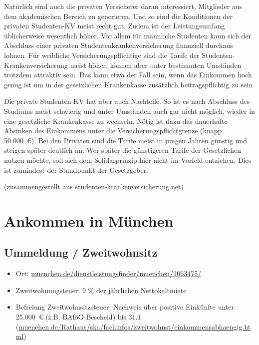 \documentclass[twoside,12pt,parskip=half-]{scrartcl}
\begin{document}
Natürlich sind auch die privaten Versicherer daran interessiert,
Mitglieder aus dem akademischen Bereich zu generieren. Und so sind die
Konditionen der privaten Studenten-KV meist recht gut. Zudem ist der
Leistungsumfang üblicherweise wesentlich höher. Vor allem für
männliche Studenten kann sich der Abschluss einer privaten
Studentenkrankenversicherung finanziell durchaus lohnen. Für weibliche
Versicherungspflichtige sind die Tarife der
Studenten-Krankenversicherung meist höher, können aber unter
bestimmten Umständen trotzdem attraktiv sein. Das kann etwa der Fall
sein, wenn das Einkommen hoch genug ist um in der gesetzlichen
Krankenkasse zusätzlich beitragspflichtig zu sein.

Die private Studenten-KV hat aber auch Nachteile. So ist es nach
Abschluss des Studiums meist schwierig und unter Umständen auch gar
nicht möglich, wieder in eine gesetzliche Krankenkasse zu
wechseln. Nötig ist dazu das dauerhafte Absinken des Einkommens unter
die Versicherungspflichtgrenze (knapp 50.000~€). Bei den Privaten sind
die Tarife meist in jungen Jahren günstig und steigen später deutlich
an. Wer später die günstigeren Tarife der Gesetzlichen nutzen möchte,
soll sich dem Solidarprinzip hier nicht im Vorfeld entziehen. Dies ist
zumindest der Standpunkt der Gesetzgeber.

\footnotesize (zusammengestellt aus {\url{studenten-krankenversicherung.net}})
\normalsize

\clearpage

\section{Ankommen in München}

\subsection{Ummeldung / Zweitwohnsitz}
\begin{itemize}
	\item Ort: \url{muenchen.de/dienstleistungsfinder/muenchen/1063475/}
	\item Zweitwohnungsteuer: 9 \% der jährlichen Nettokaltmiete
	\item Befreiung Zweitwohnsitzsteuer: Nachweis über positive Einkünfte unter 25.000~€ (z.B. BAföG-Bescheid) bis 31.1. \newline (\url{muenchen.de/Rathaus/ska/fachinfos/zweitwohnst/einkommensabhaengig.html})
\end{itemize}
\end{document}
